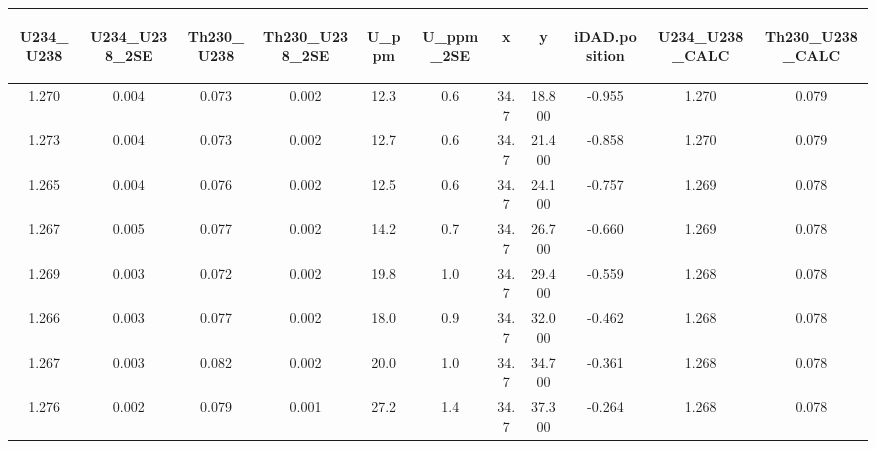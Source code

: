 \documentclass[]{elsarticle} %
\begin{document}
\begin{table}[ht]
\centering
\begin{tabular}{ccccccccccc}
  \hline
\begin{sideways} U234\_U238 \end{sideways} & \begin{sideways} U234\_U238\_2SE \end{sideways} & \begin{sideways} Th230\_U238 \end{sideways} & \begin{sideways} Th230\_U238\_2SE \end{sideways} & \begin{sideways} U\_ppm \end{sideways} & \begin{sideways} U\_ppm\_2SE \end{sideways} & \begin{sideways} x \end{sideways} & \begin{sideways} y \end{sideways} & \begin{sideways} iDAD.position \end{sideways} & \begin{sideways} U234\_U238\_CALC \end{sideways} & \begin{sideways} Th230\_U238\_CALC \end{sideways} \\ 
  \hline
1.270 & 0.004 & 0.073 & 0.002 & 12.3 & 0.6 & 34.7 & 18.800 & -0.955 & 1.270 & 0.079 \\ 
  1.273 & 0.004 & 0.073 & 0.002 & 12.7 & 0.6 & 34.7 & 21.400 & -0.858 & 1.270 & 0.079 \\ 
  1.265 & 0.004 & 0.076 & 0.002 & 12.5 & 0.6 & 34.7 & 24.100 & -0.757 & 1.269 & 0.078 \\ 
  1.267 & 0.005 & 0.077 & 0.002 & 14.2 & 0.7 & 34.7 & 26.700 & -0.660 & 1.269 & 0.078 \\ 
  1.269 & 0.003 & 0.072 & 0.002 & 19.8 & 1.0 & 34.7 & 29.400 & -0.559 & 1.268 & 0.078 \\ 
  1.266 & 0.003 & 0.077 & 0.002 & 18.0 & 0.9 & 34.7 & 32.000 & -0.462 & 1.268 & 0.078 \\ 
  1.267 & 0.003 & 0.082 & 0.002 & 20.0 & 1.0 & 34.7 & 34.700 & -0.361 & 1.268 & 0.078 \\ 
  1.276 & 0.002 & 0.079 & 0.001 & 27.2 & 1.4 & 34.7 & 37.300 & -0.264 & 1.268 & 0.078 \\ 

\end{tabular}
\end{table}
\end{document}
